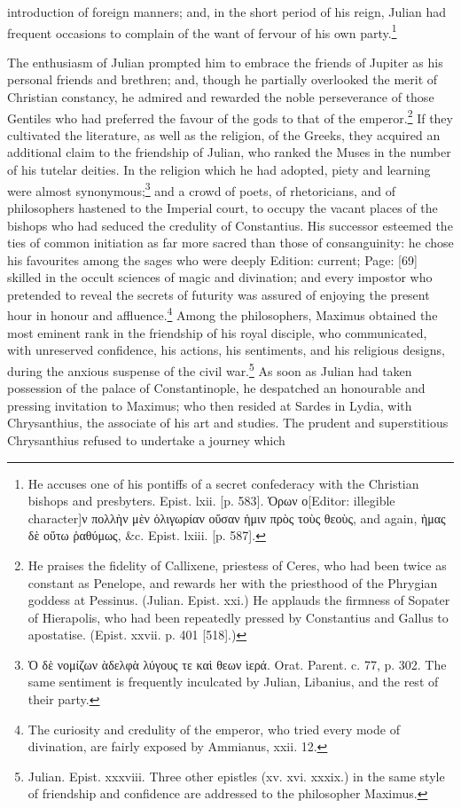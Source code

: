 introduction of foreign manners; and, in the short period of his reign, Julian had frequent occasions to complain of the want of fervour of his own party.\footnote{He accuses one of his pontiffs of a secret confederacy with the Christian bishops and presbyters. Epist. lxii. [p. 583]. \textgreek{\texthebrew{Ὁ}ρων ο}[Editor: illegible character]\textgreek{ν πολλ\texthebrew{ὴ}ν μ\texthebrew{ὲ}ν \texthebrew{ὁ}λιγωρίαν ο\texthebrew{ὔ}σαν \texthebrew{ἡ}μιν πρ\texthebrew{ὸ}ς το\texthebrew{ὺ}ς θεο\texthebrew{ὺ}ς}, and again, \textgreek{\texthebrew{ἡ}μας δ\texthebrew{ὲ} ο\texthebrew{ὔ}τω \texthebrew{ῥ}αθύμως}, \&c. Epist. lxiii. [p. 587].}

The enthusiasm of Julian prompted him to embrace the friends of Jupiter as his personal friends and brethren; and, though he partially overlooked the merit of Christian constancy, he admired and rewarded the noble perseverance of those Gentiles who had preferred the favour of the gods to that of the emperor.\footnote{He praises the fidelity of Callixene, priestess of Ceres, who had been twice as constant as Penelope, and rewards her with the priesthood of the Phrygian goddess at Pessinus. (Julian. Epist. xxi.) He applauds the firmness of Sopater of Hierapolis, who had been repeatedly pressed by Constantius and Gallus to apostatise. (Epist. xxvii. p. 401 [518].)} If they cultivated the literature, as well as the religion, of the Greeks, they acquired an additional claim to the friendship of Julian, who ranked the Muses in the number of his tutelar deities. In the religion which he had adopted, piety and learning were almost synonymous;\footnote{\textgreek{\texthebrew{Ὁ} δ\texthebrew{ὲ} νομίζων \texthebrew{ὰ}δελφ\texthebrew{ὰ} λύγους τε κα\texthebrew{ὶ} θεων \texthebrew{ὶ}ερά}. Orat. Parent. c. 77, p. 302. The same sentiment is frequently inculcated by Julian, Libanius, and the rest of their party.} and a crowd of poets, of rhetoricians, and of philosophers hastened to the Imperial court, to occupy the vacant places of the bishops who had seduced the credulity of Constantius. His successor esteemed the ties of common initiation as far more sacred than those of consanguinity: he chose his favourites among the sages who were deeply Edition: current; Page: [69] skilled in the occult sciences of magic and divination; and every impostor who pretended to reveal the secrets of futurity was assured of enjoying the present hour in honour and affluence.\footnote{The curiosity and credulity of the emperor, who tried every mode of divination, are fairly exposed by Ammianus, xxii. 12.} Among the philosophers, Maximus obtained the most eminent rank in the friendship of his royal disciple, who communicated, with unreserved confidence, his actions, his sentiments, and his religious designs, during the anxious suspense of the civil war.\footnote{Julian. Epist. xxxviii. Three other epistles (xv. xvi. xxxix.) in the same style of friendship and confidence are addressed to the philosopher Maximus.} As soon as Julian had taken possession of the palace of Constantinople, he despatched an honourable and pressing invitation to Maximus; who then resided at Sardes in Lydia, with Chrysanthius, the associate of his art and studies. The prudent and superstitious Chrysanthius refused to undertake a journey which 